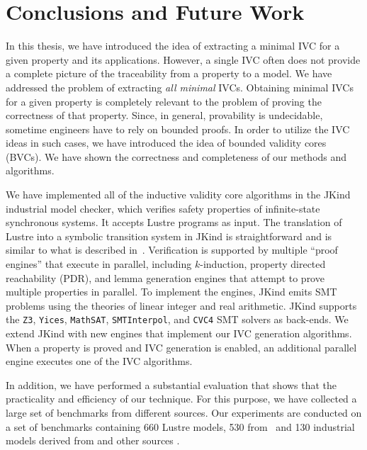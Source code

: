 \chapter{Conclusions and Future Work}

In this thesis, we have introduced the idea of extracting a minimal IVC for a given property and its applications.  However, a single IVC often does not provide a complete picture of the traceability from a property to a model.  We have addressed the problem of extracting {\em all minimal} IVCs. Obtaining minimal IVCs for a given property is completely relevant to the problem of proving the correctness of that property. Since, in general, provability is undecidable, sometime engineers have to rely on bounded proofs. In order to utilize the IVC ideas in such cases, we have introduced the idea of bounded validity cores (BVCs).
We have shown
the correctness and completeness of our methods and algorithms.

We have implemented all of the inductive validity core algorithms in the JKind ~\cite{jkind} industrial model checker,
which verifies safety properties of infinite-state synchronous systems.
It accepts Lustre programs \cite{Halbwachs91:lustre} as input.  The translation of Lustre
into a symbolic transition system in JKind is straightforward and is similar to what is described
in~\cite{Hagen08:FMCAD}.
Verification is supported by multiple ``proof engines'' that execute in parallel, including $k$-induction,
property directed reachability (PDR), and lemma generation engines that attempt to prove
multiple properties in parallel.  To implement the engines,
JKind emits SMT problems using the theories of linear integer and real arithmetic. JKind supports the \texttt{Z3}, \texttt{Yices}, \texttt{MathSAT}, \texttt{SMTInterpol}, and \texttt{CVC4} SMT solvers as back-ends.  We extend JKind with new engines that implement our IVC generation algorithms. When a property is
proved and IVC generation is enabled, an additional parallel engine
executes one of the IVC algorithms.


In addition, we have performed a substantial evaluation that shows that the practicality and efficiency of our technique. For this purpose, we have collected a large set of benchmarks from different sources. Our experiments are conducted on a set of benchmarks containing 660 Lustre models, 530 from~\cite{Hagen08:FMCAD, piskac2016} and 130 industrial models derived from \cite{hilt2013} and other sources \cite{piskac2016, NFM2015:backes}.

